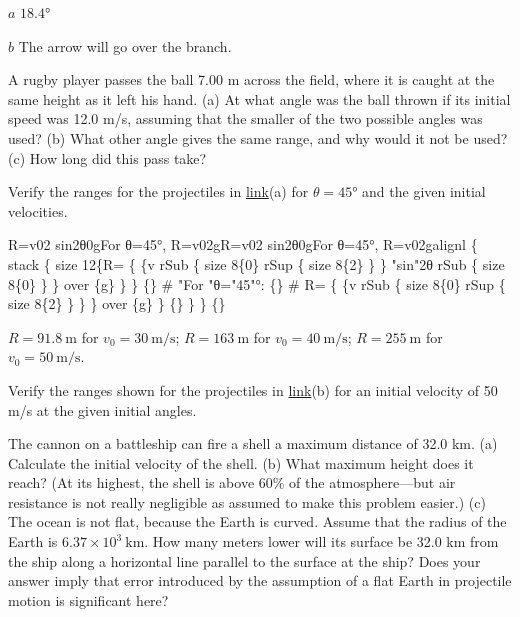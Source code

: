 \documentclass[
]{book}
\begin{document}
\leavevmode{}%
\(a\) \({\text{18}\text{.}\text{4°}}{}\)

\(b\) The arrow will go over the branch.

\hypertarget{fs-id1934878}{}
\leavevmode{}%
A rugby player passes the ball 7.00 m across the field, where it is
caught at the same height as it left his hand. (a) At what angle was the
ball thrown if its initial speed was 12.0 m/s, assuming that the smaller
of the two possible angles was used? (b) What other angle gives the same
range, and why would it not be used? (c) How long did this pass take?

\hypertarget{fs-id2126267}{}
\leavevmode{}%
Verify the ranges for the projectiles in
\protect\hyperlink{import-auto-id1904800}{link}(a) for
\({\theta = \text{45°}}{}\) and the given initial velocities.

\leavevmode{}%
{R=v02 sin2θ0gFor θ=45°, R=v02gR=v02 sin2θ0gFor θ=45°, R=v02galignl \{
stack \{ size 12\{R= \{ \{v rSub \{ size 8\{0\} rSup \{ size 8\{2\} \} \} "sin"2θ
rSub \{ size 8\{0\} \} \} over \{g\} \} \} \{\} \# "For "θ="45"°: \{\} \# R= \{ \{v
rSub \{ size 8\{0\} rSup \{ size 8\{2\} \} \} \} over \{g\} \} \{\} \} \} \{\}}

\({R = 91.8\ \text{m}}{}\) for \({v_{0} = 30\ \text{m/s}}{}\);
\({R = 163\ \text{m}}{}\) for \({v_{0} = 40\ \text{m/s}}{}\);
\({R = 255\ \text{m}}{}\) for \({v_{0} = 50\ \text{m/s}}{}\).

\hypertarget{fs-id2214647}{}
\leavevmode{}%
Verify the ranges shown for the projectiles in
\protect\hyperlink{import-auto-id1904800}{link}(b) for an initial
velocity of 50 m/s at the given initial angles.

\hypertarget{fs-id2905201}{}
\leavevmode{}%
The cannon on a battleship can fire a shell a maximum distance of 32.0
km. (a) Calculate the initial velocity of the shell. (b) What maximum
height does it reach? (At its highest, the shell is above 60\% of the
atmosphere---but air resistance is not really negligible as assumed to
make this problem easier.) (c) The ocean is not flat, because the Earth
is curved. Assume that the radius of the Earth is
\({6\text{.}{\text{37} \times \text{10}^{3}}\ \text{km}}{}\). How many
meters lower will its surface be 32.0 km from the ship along a
horizontal line parallel to the surface at the ship? Does your answer
imply that error introduced by the assumption of a flat Earth in
projectile motion is significant here?
\end{document}
